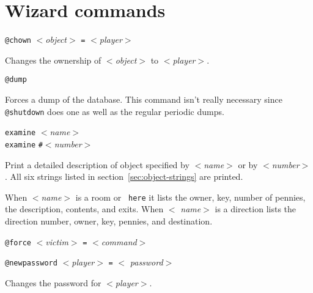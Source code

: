 \section{Wizard commands}
\label{sec:wizard-commands}

\begin{simple}

\item[]
\begin{flushleft}
{\tt @chown} $<${\em object\/}$>$ \verb|=| $<${\em player\/}$>$
\end{flushleft}
Changes the ownership of $<${\em object\/}$>$ to $<${\em player\/}$>$.

\dorule

\item[]
\begin{flushleft}
{\tt @dump}
\end{flushleft}
Forces a dump of the database.  This command isn't really necessary
since {\tt @shutdown} does one as well as the regular periodic dumps.

\dorule

\item[]
\begin{flushleft}
{\tt examine} $<${\em name\/}$>$ \\
{\tt examine} {\tt \#}$<${\em number\/}$>$
\end{flushleft}
Print a detailed description of object specified by $<${\em name\/}$>$
or by $<${\em number\/}$>$.  All six strings listed in
section~\ref{sec:object-strings} are printed.

When $<${\em name\/}$>$ is a room or {\tt
here} it lists the owner, key, number of
pennies, the description, contents, and exits.  When $<${\em
name\/}$>$ is a direction lists the direction number, owner, key,
pennies, and destination.

\dorule

\item[]
\begin{flushleft}
{\tt @force} $<${\em victim\/}$>$ \verb|=| $<${\em command\/}$>$
\end{flushleft}

\dorule

\item[]
\begin{flushleft}
{\tt @newpassword} $<${\em player\/}$>$ \verb|=| $<${\em
password\/}$>$
\end{flushleft}
Changes the password for $<${\em player\/}$>$.


\end{simple}
